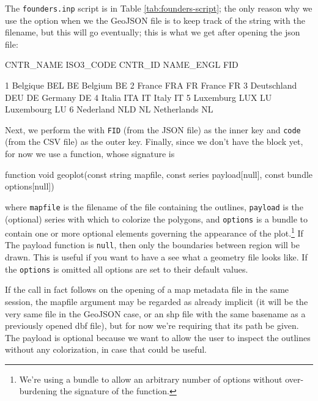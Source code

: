 \documentclass{article}
\begin{document}
The \texttt{founders.inp} script is in Table
\ref{tab:founders-script}; the only reason why we use the
 option when we  the GeoJSON file is to
keep track of the string with the filename, but this will go
eventually; this is what we get after opening the json file:
\begin{code}
     CNTR_NAME    ISO3_CODE      CNTR_ID    NAME_ENGL          FID

1     Belgique          BEL           BE      Belgium           BE
2       France          FRA           FR       France           FR
3  Deutschland          DEU           DE      Germany           DE
4       Italia          ITA           IT        Italy           IT
5    Luxemburg          LUX           LU   Luxembourg           LU
6    Nederland          NLD           NL  Netherlands           NL
\end{code}

Next, we perform the  with \texttt{FID} (from the JSON file)
as the inner key and \texttt{code} (from the CSV file) as the outer
key. Finally, since we don't have the  block yet, for now
we use a  function, whose signature is
\begin{code}
function void geoplot(const string mapfile,
	const series payload[null],
	const bundle options[null])
\end{code}
where \texttt{mapfile} is the filename of the file containing the
outlines, \texttt{payload} is the (optional) series with which to
colorize the polygons, and \texttt{options} is a bundle to contain one
or more optional elements governing the appearance of the
plot.\footnote{We're using a bundle to allow an arbitrary number of
  options without over-burdening the signature of the function.} If
The payload function is \texttt{null}, then only the boundaries
between region will be drawn. This is useful if you want to have a
see what a geometry file looks like. If the \texttt{options} is
omitted all options are set to their default values.

If the  call in fact follows on the opening of a map
metadata file in the same session, the mapfile argument may be
regarded as already implicit (it will be the very same file in the
GeoJSON case, or an shp file with the same basename as a previously
opened dbf file), but for now we're requiring that its path be
given. The payload is optional because we want to allow the user to
inspect the outlines without any colorization, in case that could be
useful.
\end{document}

